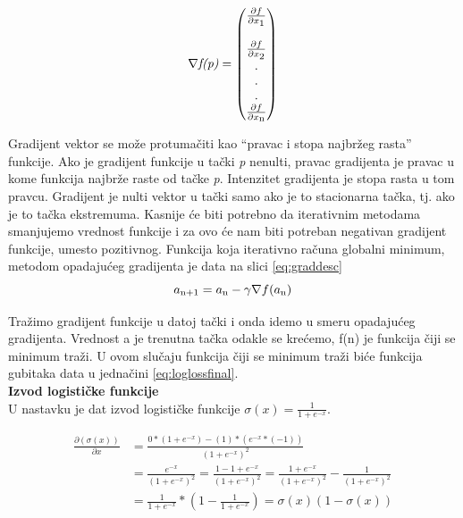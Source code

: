 \documentclass[a4paper,12pt]{report}
\begin{document}
\begin{equation}
\begin{split}
\nabla \textit{f(p)} = 
\begin{pmatrix} \frac{\partial f}{\partial x \textsubscript{1}} \\\\ \frac{\partial f}{\partial x\textsubscript{2}} \\.\\ .\\.\\ \frac{\partial f}{\partial x\textsubscript{n}} \end{pmatrix}
\end{split}
\end{equation}

Gradijent vektor se može protumačiti kao \enquote{pravac i stopa najbržeg rasta} funkcije. Ako je gradijent funkcije u tački \textit{p} nenulti, pravac gradijenta je pravac u kome funkcija najbrže raste od tačke \textit{p}. Intenzitet gradijenta je stopa rasta u tom pravcu. Gradijent je nulti vektor u tački samo ako je to stacionarna tačka, tj. ako je to tačka ekstremuma. Kasnije će biti potrebno da iterativnim metodama smanjujemo vrednost funkcije i za ovo će nam biti potreban negativan gradijent funkcije, umesto pozitivnog. Funkcija koja iterativno računa globalni minimum, metodom opadajućeg gradijenta je data na slici \ref{eq:graddesc}\\

\begin{equation} \label{eq:graddesc}
	 a\textsubscript{n+1} = a\textsubscript{n} - \gamma \nabla f(a\textsubscript{n})
\end{equation}

Tražimo gradijent funkcije u datoj tački i onda idemo u smeru opadajućeg gradijenta. Vrednost a je trenutna tačka odakle se krećemo, f(n) je funkcija čiji se minimum traži. U ovom slučaju funkcija čiji se minimum traži biće funkcija gubitaka data u jednačini \ref{eq:loglossfinal}.\\

\textbf{Izvod logističke funkcije}\\

U nastavku je dat izvod logističke funkcije $\sigma(x)  = \frac{1}{1+e^{-x}}$.

\begin{equation}
\begin{split}
	\frac{\partial (\sigma(x))}{\partial x} & = \frac{0 * (1 + e^{-x}) - (1)*(e^{-x}*(-1))}{({1+e^{-x}})^2} \\
 		& = \frac{ e^{-x}}{({1+e^{-x}})^2} = \frac{1-1 + e^{-x}}{({1+e^{-x}})^2}= \frac{ 1 + e^{-x}}{({1+e^{-x}})^2} - \frac{1}{({1+e^{-x}})^2} \\
 		& = \frac{1}{1+e^{-x}} * \left( 1 - \frac{1}{1+e^{-x}}\right) = \sigma(x)(1-\sigma(x))
\end{split}
\end{equation}
\end{document}
